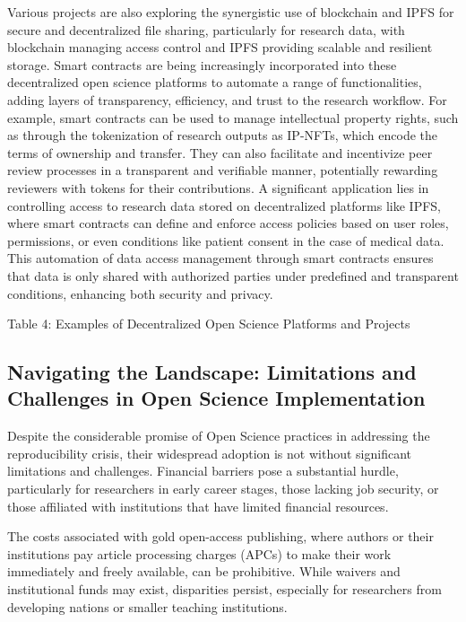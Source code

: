 Various projects are also exploring the synergistic use of blockchain and IPFS for secure and decentralized file sharing, particularly for research data, with blockchain managing access control and IPFS providing scalable and resilient storage. Smart contracts are being increasingly incorporated into these decentralized open science platforms to automate a range of functionalities, adding layers of transparency, efficiency, and trust to the research workflow. For example, smart contracts can be used to manage intellectual property rights, such as through the tokenization of research outputs as IP-NFTs, which encode the terms of ownership and transfer. They can also facilitate and incentivize peer review processes in a transparent and verifiable manner, potentially rewarding reviewers with tokens for their contributions. A significant application lies in controlling access to research data stored on decentralized platforms like IPFS, where smart contracts can define and enforce access policies based on user roles, permissions, or even conditions like patient consent in the case of medical data. This automation of data access management through smart contracts ensures that data is only shared with authorized parties under predefined and transparent conditions, enhancing both security and privacy.

Table 4: Examples of Decentralized Open Science Platforms and Projects

\subsection{Navigating the Landscape: Limitations and Challenges in Open Science Implementation}

Despite the considerable promise of Open Science practices in addressing the reproducibility crisis, their widespread adoption is not without significant limitations and challenges. Financial barriers pose a substantial hurdle, particularly for researchers in early career stages, those lacking job security, or those affiliated with institutions that have limited financial resources.

The costs associated with gold open-access publishing, where authors or their institutions pay article processing charges (APCs) to make their work immediately and freely available, can be prohibitive. While waivers and institutional funds may exist, disparities persist, especially for researchers from developing nations or smaller teaching institutions.

